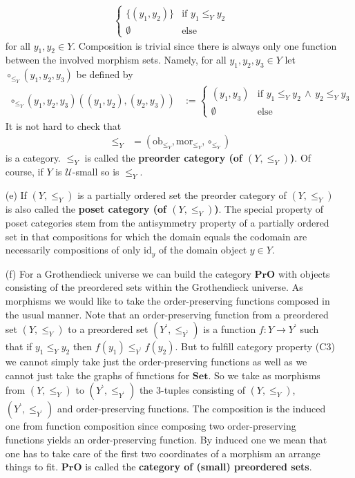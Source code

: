 \begin{exa}
\begin{enumerate}
\begin{align*}
\begin{cases}
    \lbrace (y_{1},y_{2}) \rbrace
    &
    \text{if }
    y_{1}
    \leq_{Y}
    y_{2}
    \\
    \emptyset
    &
    \text{else}
  \end{cases}
\end{align*}
for all $y_{1},y_{2} \in Y$. Composition is trivial since there is always only one function between the involved morphism sets. Namely, for all $y_{1},y_{2},y_{3} \in Y$ let $\circ_{\pmb{\leq}_{Y}}(y_{1},y_{2},y_{3})$ be defined by
\begin{align*}
  \circ_{\pmb{\leq}_{Y}}(y_{1},y_{2},y_{3})
  \left(
    (y_{1},y_{2}),
    (y_{2},y_{3})
  \right)
  &:=
  \begin{cases}
    (y_{1},y_{3})
    &
    \text{if }
    y_{1}
    \leq_{Y}
    y_{2}
    \,
    \land
    \,
    y_{2}
    \leq_{Y}
    y_{3}
    \\
    \emptyset
    &
    \text{else}
  \end{cases}
\end{align*}
It is not hard to check that
\begin{align*}
  \pmb{\leq}_{Y}
  &=
  \left(
    \mathrm{ob}_{\pmb{\leq}_{Y}},
    \mathrm{mor}_{\pmb{\leq}_{Y}},
    \circ_{\pmb{\leq}_{Y}}
  \right)
\end{align*}
is a category. $\pmb{\leq}_{Y}$ is called the \textbf{preorder category (of $(Y,\leq_{Y})$)}. Of course, if $Y$ is $\mathcal{U}$-small so is $\pmb{\leq}_{Y}$.
\item[(e)]
If $(Y,\leq_{Y})$ is a partially ordered set the preorder category of $(Y,\leq_{Y})$ is also called the \textbf{poset category (of $(Y,\leq_{Y})$)}. The special property of poset categories stem from the antisymmetry property of a partially ordered set in that compositions for which the domain equals the codomain are necessarily compositions of only $\mathrm{id}_{y}$ of the domain object $y \in Y$.
\item[(f)]
For a Grothendieck universe we can build the category $\mathbf{PrO}$ with objects consisting of the preordered sets within the Grothendieck universe. As morphisms we would like to take the order-preserving functions composed in the usual manner. Note that an order-preserving function from a preordered set $(Y,\leq_{Y})$ to a preordered set $(Y^{\backprime},\leq_{Y^{\backprime}})$ is a function $f \colon Y \rightarrow Y^{\backprime}$ such that if $y_{1} \leq_{Y} y_{2}$ then $f(y_{1}) \leq_{Y^{\backprime}} f(y_{2})$. But to fulfill category property (C3) we cannot simply take just the order-preserving functions as well as we cannot just take the graphs of functions for $\mathbf{Set}$. So we take as morphisms from $(Y,\leq_{Y})$ to  $(Y^{\backprime},\leq_{Y^{\backprime}})$ the $3$-tuples consisting of $(Y,\leq_{Y})$, $(Y^{\backprime},\leq_{Y^{\backprime}})$ and order-preserving functions. The composition is the induced one from function composition since composing two order-preserving functions yields an order-preserving function. By induced one we mean that one has to take care of the first two coordinates of a morphism an arrange things to fit. $\mathbf{PrO}$ is called the \textbf{category of (small) preordered sets}.
\end{enumerate}
\end{exa}
